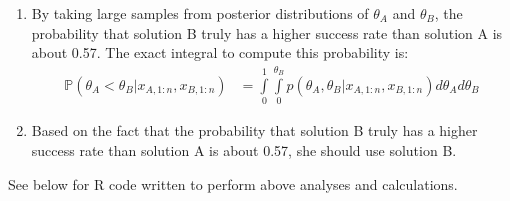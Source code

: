 \documentclass{article}
\begin{document}
\begin{enumerate}
\item By taking large samples from posterior distributions of $\theta_A$ and $\theta_B$, the probability that solution B truly has a higher success rate than solution A is about 0.57. The exact integral to compute this probability is:
\begin{align*}
\mathds{P}(\theta_A<\theta_B|x_{A,1:n},x_{B,1:n}) & = %
\int\limits_{0}^{1} \int\limits_{0}^{\theta_B}p(\theta_A,\theta_B|x_{A,1:n},x_{B,1:n})d\theta_A d\theta_B
\end{align*}

\item Based on the fact that the probability that solution B truly has a higher success rate than solution A is about 0.57, she should use solution B.
\end{enumerate}
See below for R code written to perform above analyses and calculations.

\end{document}
